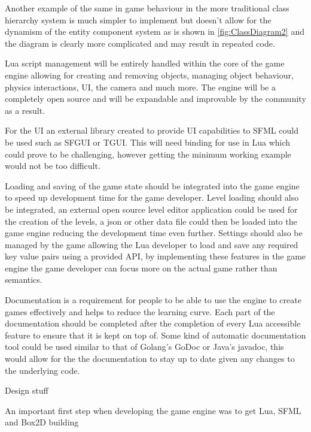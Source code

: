 \documentclass[11pt,a4paper,titlepage]{article}
\begin{document}
	Another example of the same in game behaviour in the more traditional class hierarchy system is much simpler to implement but doesn't allow for the dynamism of the entity component system as is shown in \ref{fig:ClassDiagram2} and the diagram is clearly more complicated and may result in repeated code. 

	Lua script management will be entirely handled within the core of the game engine allowing for creating and removing objects, managing object behaviour, physics interactions, UI, the camera and much more. The engine will be a completely open source and will be expandable and improvable by the community as a result.

	For the UI an external library created to provide UI capabilities to SFML could be used such as SFGUI or TGUI. This will need binding for use in Lua which could prove to be challenging, however getting the minimum working example would not be too difficult.

	Loading and saving of the game state should be integrated into the game engine to speed up development time for the game developer. Level loading should also be integrated, an external open source level editor application could be used for the creation of the levels, a json or other data file could then be loaded into the game engine reducing the development time even further. Settings should also be managed by the game allowing the Lua developer to load and save any required key value pairs using a provided API, by implementing these features in the game engine the game developer can focus more on the actual game rather than semantics.

	Documentation is a requirement for people to be able to use the engine to create games effectively and helps to reduce the learning curve. Each part of the documentation should be completed after the completion of every Lua accessible feature to ensure that it is kept on top of. Some kind of automatic documentation tool could be used similar to that of Golang's GoDoc or Java's javadoc, this would allow for the the documentation to stay up to date given any changes to the underlying code.
		

	Design stuff

	An important first step when developing the game engine was to get Lua, SFML and Box2D building 
\end{document}
